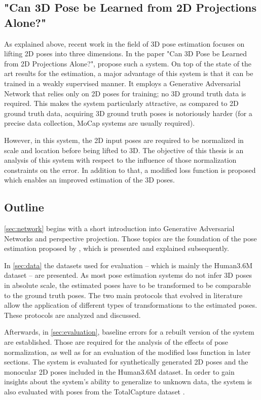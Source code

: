 \subsection{"Can 3D Pose be Learned from 2D Projections Alone?"}

As explained above, recent work in the field of 3D pose estimation focuses on lifting 2D poses into three dimensions. 
In the paper "Can 3D Pose be Learned from 2D Projections Alone?", \citet{drover18} propose such a system.
On top of the state of the art results for the estimation, a major advantage of this system is that it can be trained in a weakly supervised manner.
It employs a Generative Adversarial Network \cite{goodfellow14} that relies only on 2D poses for training; no 3D ground truth data is required.
This makes the system particularly attractive, as compared to 2D ground truth data, acquiring 3D ground truth poses is notoriously harder (for a precise data collection, MoCap systems are usually required).

However, in this system, the 2D input poses are required to be normalized in scale and location before being lifted to 3D.
The objective of this thesis is an analysis of this system with respect to the influence of those normalization constraints on the error.
In addition to that, a modified loss function is proposed which enables an improved estimation of the 3D poses.

\subsection{Outline}

\autoref{sec:network} begins with a short introduction into Generative Adversarial Networks and perspective projection.
Those topics are the foundation of the pose estimation proposed by \citet{drover18}, which is presented and explained subsequently.

In \autoref{sec:data} the datasets used for evaluation -- which is mainly the Human3.6M dataset \cite{ionescu14} -- are presented.
As most pose estimation systems do not infer 3D poses in absolute scale, the estimated poses have to be transformed to be comparable to the ground truth poses.
The two main protocols that evolved in literature allow the application of different types of transformations to the estimated poses.
These protocols are analyzed and discussed.

Afterwards, in \autoref{sec:evaluation}, baseline errors for a rebuilt version of the system are established.
Those are required for the analysis of the effects of pose normalization, as well as for an evaluation of the modified loss function in later sections.
The system is evaluated for synthetically generated 2D poses and the monocular 2D poses included in the Human3.6M dataset.
In order to gain insights about the system's ability to generalize to unknown data, the system is also evaluated with poses from the TotalCapture dataset \cite{trumble17}.

